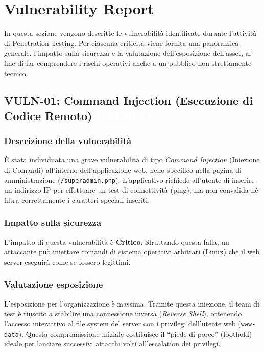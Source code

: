 \documentclass[11pt]{article}
\newcommand{\sev}[2]{%
  \setlength{\fboxsep}{3pt}%
  \colorbox{#1}{\textcolor{white}{\small\textbf{#2}}}%
}
\newcommand{\sevCRIT}{\sev{sevCritico}{CRITICO}}
\begin{document}
\section{Vulnerability Report}
In questa sezione vengono descritte le vulnerabilità identificate durante l'attività di Penetration Testing. Per ciascuna criticità viene fornita una panoramica generale, l'impatto sulla sicurezza e la valutazione dell'esposizione dell'asset, al fine di far comprendere i rischi operativi anche a un pubblico non strettamente tecnico.

\subsection{VULN-01: Command Injection (Esecuzione di Codice Remoto) \hfill \sevCRIT}
\subsubsection{Descrizione della vulnerabilità}
È stata individuata una grave vulnerabilità di tipo \textit{Command Injection} (Iniezione di Comandi) all'interno dell'applicazione web, nello specifico nella pagina di amministrazione (\texttt{/superadmin.php}). L'applicativo richiede all'utente di inserire un indirizzo IP per effettuare un test di connettività (ping), ma non convalida né filtra correttamente i caratteri speciali inseriti.

\subsubsection{Impatto sulla sicurezza}
L'impatto di questa vulnerabilità è \textbf{Critico}. Sfruttando questa falla, un attaccante può iniettare comandi di sistema operativi arbitrari (Linux) che il web server eseguirà come se fossero legittimi.

\subsubsection{Valutazione esposizione}
L'esposizione per l'organizzazione è massima. Tramite questa iniezione, il team di test è riuscito a stabilire una connessione inversa (\textit{Reverse Shell}), ottenendo l'accesso interattivo al file system del server con i privilegi dell'utente web (\texttt{www-data}). Questa compromissione iniziale costituisce il ``piede di porco'' (foothold) ideale per lanciare successivi attacchi volti all'escalation dei privilegi.
\end{document}
